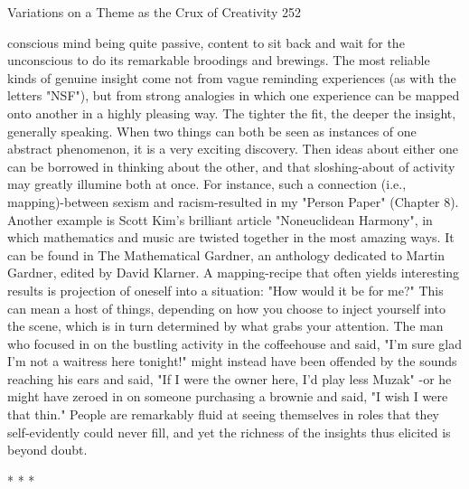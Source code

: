 Variations on a Theme as the Crux of Creativity                                       252

conscious mind being quite passive, content to sit back and wait for the unconscious
to do its remarkable broodings and brewings.
        The most reliable kinds of genuine insight come not from vague reminding
experiences (as with the letters "NSF"), but from strong analogies in which one
experience can be mapped onto another in a highly pleasing way. The tighter the fit,
the deeper the insight, generally speaking. When two things can both be seen as
instances of one abstract phenomenon, it is a very exciting discovery. Then ideas
about either one can be borrowed in thinking about the other, and that sloshing-about
of activity may greatly illumine both at once. For instance, such a connection (i.e.,
mapping)-between sexism and racism-resulted in my "Person Paper" (Chapter 8).
Another example is Scott Kim's brilliant article "Noneuclidean Harmony", in which
mathematics and music are twisted together in the most amazing ways. It can be
found in The Mathematical Gardner, an anthology dedicated to Martin Gardner,
edited by David Klarner.
        A mapping-recipe that often yields interesting results is projection of oneself
into a situation: "How would it be for me?" This can mean a host of things, depending
on how you choose to inject yourself into the scene, which is in turn determined by
what grabs your attention. The man who focused in on the bustling activity in the
coffeehouse and said, "I'm sure glad I'm not a waitress here tonight!" might instead
have been offended by the sounds reaching his ears and said, "If I were the owner
here, I'd play less Muzak" -or he might have zeroed in on someone purchasing a
brownie and said, "I wish I were that thin." People are remarkably fluid at seeing
themselves in roles that they self-evidently could never fill, and yet the richness of the
insights thus elicited is beyond doubt.

                                        *       *      *

